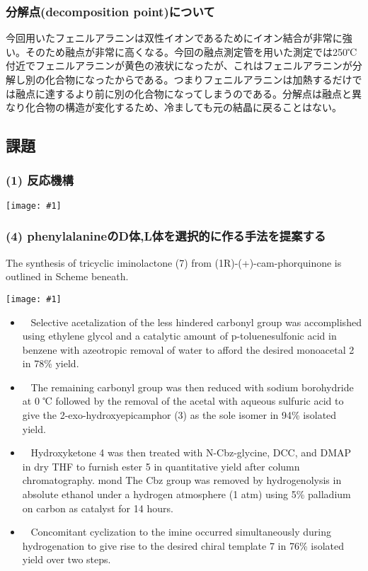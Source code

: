 \documentclass[a4paper,papersize,dvipdfmx]{jsarticle}
\newcommand{\pict}[2]{\begin{center} \texttt{[image: \#1]} \end{center}}   %
\newcommand{\mon}[1]{\item[({#1})] \ }
\begin{document}
\subsubsection*{分解点(decomposition point)について}
今回用いたフェニルアラニンは双性イオンであるためにイオン結合が非常に強い。そのため融点が非常に高くなる。今回の融点測定管を用いた測定では250℃付近でフェニルアラニンが黄色の液状になったが、これはフェニルアラニンが分解し別の化合物になったからである。つまりフェニルアラニンは加熱するだけでは融点に達するより前に別の化合物になってしまうのである。分解点は融点と異なり化合物の構造が変化するため、冷ましても元の結晶に戻ることはない。

\subsection*{課題}

\subsubsection*{(1) 反応機構}
\pict{imgs6/hk.jpeg}{14}

\newpage

\subsubsection*{(4) phenylalanineのD体,L体を選択的に作る手法を提案する}

\small

The synthesis of tricyclic iminolactone (7) from (1R)-(+)-cam-phorquinone is outlined in Scheme beneath.

\pict{imgs-k/hk1.jpeg}{10}

\begin{itemize}
\mon{a} Selective acetalization of the less hindered carbonyl group was  accomplished  using ethylene glycol and a catalytic amount of p-toluenesulfonic acid in benzene with azeotropic removal of water to afford the desired monoacetal 2 in 78\% yield.

\mon{b} The remaining carbonyl group was then reduced with sodium borohydride at 0 ℃ followed by the removal of the acetal with aqueous sulfuric acid to give the 2-exo-hydroxyepicamphor (3) as the sole isomer in 94\% isolated yield.

\mon{c} Hydroxyketone 4 was then treated with N-Cbz-glycine, DCC, and DMAP in dry THF to furnish ester 5 in quantitative yield after column chromatography. 
mon{d} The Cbz group was removed by hydrogenolysis in absolute ethanol under a hydrogen atmosphere (1 atm) using 5\% palladium on carbon as catalyst for 14 hours. 

\mon{e} Concomitant cyclization to the imine occurred simultaneously during hydrogenation to give rise to the desired chiral template 7 in 76\% isolated yield over two steps.
\end{itemize}
\end{document}
